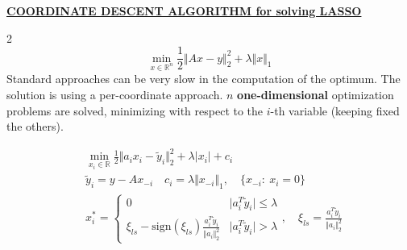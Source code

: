 \documentclass[a4paper]{article}
\begin{document}
\noindent
\textbf{\underline{COORDINATE DESCENT ALGORITHM for solving LASSO}}
\begin{multicols}{2}
    \begin{equation}\label{eq:LASSO} \tag{LASSO}
        \min_{x\in\mathbb{R}^n} \frac{1}{2} \Vert Ax-y \Vert_2^2 + \lambda \Vert x \Vert_1
    \end{equation}
    Standard approaches can be very slow in the computation of the optimum. The solution is using a per-coordinate approach.
    $n$ \textbf{one-dimensional} optimization problems are solved, minimizing with respect to the $i$-th variable (keeping fixed the others).

    \begin{align*}
        &\min_{x_i \in \mathbb{R}} \frac{1}{2} \Vert a_i{x_i}-\tilde{y}_i \Vert_2^2 + \lambda \vert x_i \vert + c_i \\
        &\tilde{y}_i = y-A{x_{-i}} \quad  c_i=\lambda \Vert x_{-i} \Vert_1, \quad \{x_{-i}: \ x_i=0\}\\
        &x_i^* = \begin{cases}
            0 & \vert a_i^T{\tilde{y}_i} \vert \le \lambda\\
            \xi_{ls}-\text{sign}(\xi_{ls})\frac{a_i^T \tilde{y}_i}{\Vert a_i \Vert_2^2}&\vert a_i^T{\tilde{y}_i} \vert > \lambda
        \end{cases},  \quad
            \xi_{ls}=\frac{a_i^{T}\tilde{y}_i}{\Vert a_i \Vert_2^2}
    \end{align*}
\end{multicols}
\end{document}
